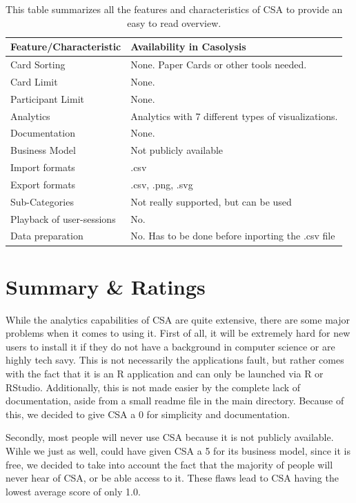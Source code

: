 \begin{table}[tp]
\centering
\begin{tabularx}
{\linewidth}{|l|X|}
\hline \textbf{Feature/Characteristic} & \textbf{Availability in Casolysis} \\ 
\hline Card Sorting & None. Paper Cards or other tools needed. \\ 
\hline Card Limit & None. \\
\hline Participant Limit & None. \\
\hline Analytics & Analytics with 7 different types of visualizations. \\ 
\hline Documentation & None. \\
\hline Business Model & Not publicly available \\
\hline Import formats & .csv\\ 
\hline Export formats & .csv, .png, .svg \\ 
\hline Sub-Categories & Not really supported, but can be used \\ 
\hline Playback of user-sessions & No. \\ 
\hline Data preparation & No. Has to be done before inporting the .csv file \\ 
\hline
\end{tabularx} 
\caption[Feature summary of CSA] 
{ 
This table summarizes all the features and characteristics of CSA
to provide an easy to read overview.
}
\label{tab:features-CSA}
\end{table}

\section{Summary \& Ratings}
While the analytics capabilities of CSA are quite extensive, there are some 
major problems when it comes to using it. First of all, it will be extremely 
hard for new users to install it if they do not have a background in computer 
science or are highly tech savy. This is not necessarily the applications 
fault, but rather comes with the fact that it is an R application and can only 
be launched via R or RStudio. Additionally, this is not made easier by the 
complete lack of documentation, aside from a small readme file in the main 
directory. Because of this, we decided to give CSA a 0 for simplicity and 
documentation. 

Secondly, most people will never use CSA because it is not publicly available. 
Wihle we just as well, could have given CSA a 5 for its business model, since 
it is free, we decided to take into account the fact that the majority of people
will never hear of CSA, or be able access to it. These flaws lead to CSA 
having the lowest average score of only 1.0.





